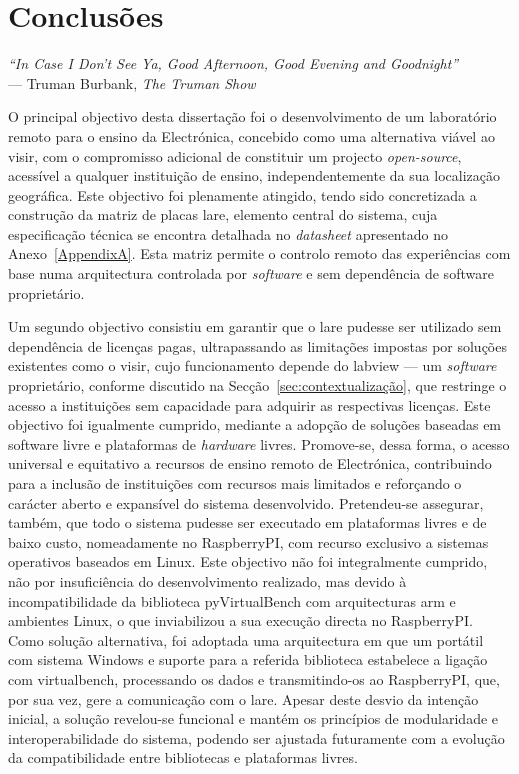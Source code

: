 \chapter{Conclusões}
\label{Capítulo6}
\begin{flushright}
\textit{``In Case I Don't See Ya, Good Afternoon, Good Evening and Goodnight''} \\[0.5em]
--- Truman Burbank, \textit{The Truman Show}
\end{flushright}
O principal objectivo desta dissertação foi o desenvolvimento de um laboratório remoto para o ensino da Electrónica, concebido como uma alternativa viável ao \acrshort{visir}, com o compromisso adicional de constituir um projecto \textit{open-source}, acessível a qualquer instituição de ensino, independentemente da sua localização geográfica. Este objectivo foi plenamente atingido, tendo sido concretizada a construção da matriz de placas \acrshort{lare}, elemento central do sistema, cuja especificação técnica se encontra detalhada no \textit{datasheet} apresentado no Anexo~\ref{AppendixA}. Esta matriz permite o controlo remoto das experiências com base numa arquitectura controlada por \textit{software} e sem dependência de software proprietário.

Um segundo objectivo consistiu em garantir que o \acrshort{lare} pudesse ser utilizado sem dependência de licenças pagas, ultrapassando as limitações impostas por soluções existentes como o \acrshort{visir}, cujo funcionamento depende do \acrshort{labview} — um \textit{software} proprietário, conforme discutido na Secção~\ref{sec:contextualização}, que restringe o acesso a instituições sem capacidade para adquirir as respectivas licenças. Este objectivo foi igualmente cumprido, mediante a adopção de soluções baseadas em software livre e plataformas de \textit{hardware} livres. Promove-se, dessa forma, o acesso universal e equitativo a recursos de ensino remoto de Electrónica, contribuindo para a inclusão de instituições com recursos mais limitados e reforçando o carácter aberto e expansível do sistema desenvolvido. Pretendeu-se assegurar, também, que todo o sistema pudesse ser executado em plataformas livres e de baixo custo, nomeadamente no \gls{RaspberryPI}, com recurso exclusivo a sistemas operativos baseados em Linux. Este objectivo não foi integralmente cumprido, não por insuficiência do desenvolvimento realizado, mas devido à incompatibilidade da biblioteca pyVirtualBench com arquitecturas \acrshort{arm} e ambientes Linux, o que inviabilizou a sua execução directa no \gls{RaspberryPI}. Como solução alternativa, foi adoptada uma arquitectura em que um portátil com sistema Windows e suporte para a referida biblioteca estabelece a ligação com \acrshort{virtualbench}, processando os dados e transmitindo-os ao \gls{RaspberryPI}, que, por sua vez, gere a comunicação com o \acrshort{lare}. Apesar deste desvio da intenção inicial, a solução revelou-se funcional e mantém os princípios de modularidade e interoperabilidade do sistema, podendo ser ajustada futuramente com a evolução da compatibilidade entre bibliotecas e plataformas livres.

